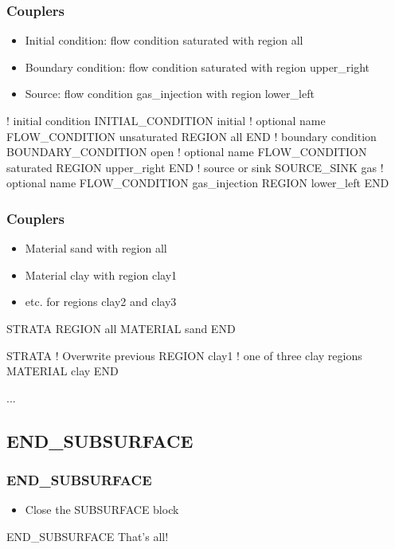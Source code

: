 \documentclass{beamer}
\newcommand\redcomment[1]{{{\color{red} #1}}}
\newcommand\bluecomment[1]{{{\color{blue} #1}}}
\newcommand\greencomment[1]{{{\color{green} #1}}}
\begin{document}
\begin{frame}[fragile]\frametitle{Couplers}

\begin{itemize}
  \item \redcomment{Initial condition}: flow condition \greencomment{saturated} with region \greencomment{all}
  \item \redcomment{Boundary condition}: flow condition \greencomment{saturated} with region \greencomment{upper\_right}
  \item \redcomment{Source}: flow condition \greencomment{gas\_injection} with region \greencomment{lower\_left}
\end{itemize}

\begin{semiverbatim}\small
\bluecomment{! initial condition}
INITIAL_CONDITION initial \bluecomment{! optional name}
  FLOW_CONDITION unsaturated
  REGION all
END
\bluecomment{! boundary condition}
BOUNDARY_CONDITION open \bluecomment{! optional name}
  FLOW_CONDITION saturated
  REGION upper_right
END
\bluecomment{! source or sink }
SOURCE_SINK gas \bluecomment{! optional name}
  FLOW_CONDITION gas_injection
  REGION lower_left
END
\end{semiverbatim}
\end{frame}

\begin{frame}[fragile]\frametitle{Couplers}

\begin{itemize}
  \item{Material \greencomment{sand} with region \greencomment{all}}
  \item{Material \greencomment{clay} with region \greencomment{clay1}}
  \item{etc. for regions \greencomment{clay2} and \greencomment{clay3}}
\end{itemize}

\begin{semiverbatim}\small
STRATA
  REGION all
  MATERIAL sand
END

STRATA         \bluecomment{! Overwrite previous}
  REGION clay1 \bluecomment{! one of three clay regions}
  MATERIAL clay
END

...
\end{semiverbatim}
\end{frame}

\subsection{END\_SUBSURFACE}
\begin{frame}[fragile]\frametitle{END\_SUBSURFACE}
\begin{itemize}
  \item Close the SUBSURFACE block
\end{itemize}

\begin{semiverbatim}
END_SUBSURFACE \bluecomment{That's all!}
\end{semiverbatim}
\end{frame}
\end{document}
